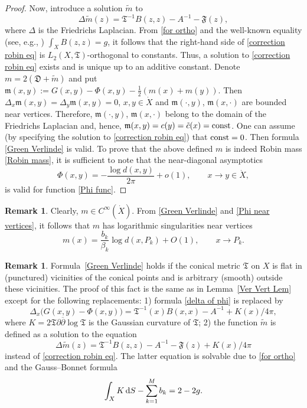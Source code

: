 \documentclass[pdftex]{sigma}
\numberwithin{equation}{section}
\theoremstyle{definition}
\newtheorem{Remark}[Theorem]{Remark}
\begin{document}
\begin{proof}
Now, introduce a solution $\tilde{m}$ to
\begin{equation}\label{correction robin eq}
\Delta\tilde{m}(z)=\mathfrak{T}^{-1}B(z,z)-A^{-1}-\mathfrak{F}(z),
\end{equation}
where $\Delta$ is the Friedrichs Laplacian. From \eqref{for ortho} and the well-known equality (see, e.g., \cite[p.15]{Fay})
$\int_X B(z,z)=g$,
it follows that the right-hand side of \eqref{correction robin eq} is $L_2(X,\mathfrak{T})$-orthogonal to constants. Thus, a solution to \eqref{correction robin eq} exists and is unique up to an additive constant. Denote $m=2(\mathfrak{D}+\tilde{m})$ and put $\mathfrak{m}(x,y):=G(x,y)-\Phi(x,y)-\frac{1}{2}(m(x)+m(y))$. Then
$
\Delta_x\mathfrak{m}(x,y)=\Delta_y\mathfrak{m}(x,y)=0$, $x,y\in\dot{X}$
and $\mathfrak{m}(\cdot,y)$, $\mathfrak{m}(x,\cdot)$ are bounded near vertices. Therefore, $\mathfrak{m}(\cdot,y)$, $\mathfrak{m}(x,\cdot)$ belong to the domain of the Friedrichs Laplacian and, hence, $\mathfrak{m}(x,y)=c(y)=\tilde{c}(x)={\rm const}$. One can assume (by specifying the solution to \eqref{correction robin eq}) that ${\rm const}=0$. Then formula \eqref{Green Verlinde} is valid. To prove that the above defined $m$ is indeed Robin mass \eqref{Robin mass}, it is sufficient to note that the near-diagonal asymptotics
\[\Phi(x,y)=-\frac{\log d(x,y)}{2\pi}+o(1), \qquad x\to y\in\dot{X},\]
is valid for function \eqref{Phi func}.
\end{proof}

\begin{Remark}\label{Ver Rem}
Clearly, $m\in C^{\infty}(\dot{X})$. From \eqref{Green Verlinde} and \eqref{Phi near vertices}, it follows that $m$ has logarithmic singularities near vertices
\[m(x)=\frac{b_k}{\beta_k}\log d(x,P_k)+O(1), \qquad x\to P_k.\]
\end{Remark}
\begin{Remark}\label{smoth conical case rem 1}
Formula~\eqref{Green Verlinde} holds if the conical metric $\mathfrak{T}$ on $X$ is flat in {\rm(}punctured{\rm)} vicinities of the conical points and is arbitrary (smooth) outside these vicinities. The proof of this fact is the same as in Lemma~\ref{Ver Vert Lem} except for the following replacements: 1) formula \eqref{delta of phi} is replaced by
\[\Delta_{x}\bigl(G(x,y)-\Phi(x,y)\bigr)=\mathfrak{T}^{-1}(x)B(x,x)-A^{-1}+K(x)/4\pi,\]
where $K=2\mathfrak{T}\partial\overline{\partial}\log \mathfrak{T}$ is the Gaussian curvature of $\mathfrak{T}$; 2) the function $\tilde{m}$ is defined as a solution to the equation
\[\Delta\tilde{m}(z)=\mathfrak{T}^{-1}B(z,z)-A^{-1}-\mathfrak{F}(z)+K(x)/4\pi\]
instead of {\rm \eqref{correction robin eq}}. The latter equation is solvable due to \eqref{for ortho} and the Gauss--Bonnet formula
\[\int_X K\,{\rm d }S-\sum_{k=1}^M b_k=2-2g.\]
\end{Remark}
\end{document}
